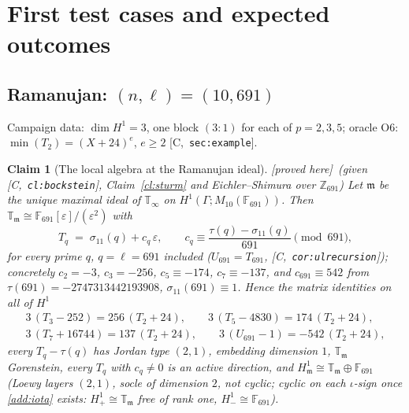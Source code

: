 \documentclass[11pt]{article}
\newtheorem{claim}[theorem]{Claim}
\theoremstyle{remark}
\newcommand{\F}{\mathbb{F}}
\newcommand{\Z}{\mathbb{Z}}
\newcommand{\Ga}{\Gamma}
\newcommand{\T}{\mathbb{T}}
\newcommand{\m}{\mathfrak{m}}
\newcommand{\HA}[1]{[C,~\texttt{#1}]}      %
\newcommand{\PROVED}{\textsf{[proved here]}}
\begin{document}
\section{First test cases and expected outcomes}\label{sec:tests}

\subsection{Ramanujan: \texorpdfstring{$(n,\ell)=(10,691)$}{(n,l)=(10,691)}}
Campaign data: $\dim H^1=3$, one block $(3{:}1)$ for each of $p=2,3,5$; oracle O6:
$\min(T_2)=(X+24)^e$, $e\ge2$ \HA{sec:example}.

\begin{claim}[The local algebra at the Ramanujan ideal]\label{cl:ramanujan}\PROVED\ (given \HA{cl:bockstein}, Claim~\ref{cl:sturm} and Eichler--Shimura over $\Z_{691}$)
Let $\m$ be the unique maximal ideal of $\T_\infty$ on $H^1(\Ga;M_{10}(\F_{691}))$. Then
$\T_\m\cong\F_{691}[\varepsilon]/(\varepsilon^2)$ with
\[
T_q\;=\;\sigma_{11}(q)+c_q\,\varepsilon,\qquad
c_q\equiv\frac{\tau(q)-\sigma_{11}(q)}{691}\pmod{691},
\]
for every prime $q$, $q=\ell=691$ included ($U_{691}=T_{691}$, \HA{cor:ulrecursion}); concretely
$c_2=-3$, $c_3=-256$, $c_5\equiv-174$, $c_7\equiv-137$, and $c_{691}\equiv542$ from
$\tau(691)=-2747313442193908$, $\sigma_{11}(691)\equiv1$. Hence the \emph{matrix identities} on
all of $H^1$
\begin{gather*}
3\,(T_3-252)=256\,(T_2+24),\qquad 3\,(T_5-4830)=174\,(T_2+24),\\
3\,(T_7+16744)=137\,(T_2+24),\qquad 3\,(U_{691}-1)=-542\,(T_2+24),
\end{gather*}
every $T_q-\tau(q)$ has Jordan type $(2,1)$, embedding dimension $1$, $\T_\m$ Gorenstein,
every $T_q$ with $c_q\ne0$ is an active direction, and $H^1_\m\cong\T_\m\oplus\F_{691}$
(Loewy layers $(2,1)$, socle of dimension $2$, not cyclic; cyclic on each $\iota$-sign once
\ref{add:iota} exists: $H^1_+\cong\T_\m$ free of rank one, $H^1_-\cong\F_{691}$).
\end{claim}
\end{document}
